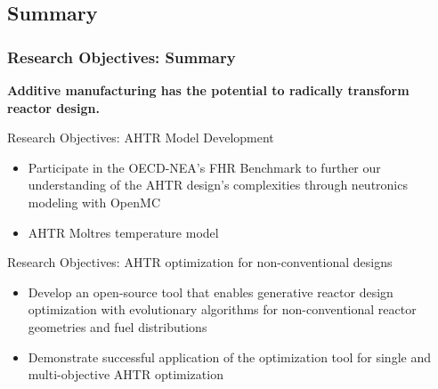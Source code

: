 \subsection{Summary}
\begin{frame}
    \frametitle{Research Objectives: Summary}
    \textbf{Additive manufacturing has the potential to radically transform reactor 
    design.}
    \begin{block}{Research Objectives: AHTR Model Development}
        \begin{itemize}
            \item Participate in the OECD-NEA's FHR Benchmark to further our understanding 
            of the AHTR design's complexities through neutronics modeling with 
            OpenMC \cite{romano_openmc:_2015}
            \item AHTR Moltres \cite{lindsay_moltres_2017} temperature model
        \end{itemize}
    \end{block}

    \begin{block}{Research Objectives: AHTR optimization for non-conventional designs}
        \begin{itemize}
            \item Develop an open-source tool that enables generative reactor design 
            optimization with evolutionary algorithms for non-conventional reactor
            geometries and fuel distributions
            \item Demonstrate successful application of the optimization tool 
            for single and multi-objective AHTR optimization
        \end{itemize}
    \end{block}
\end{frame}